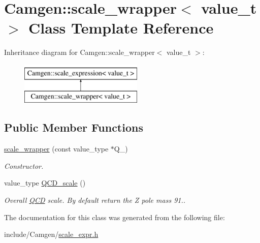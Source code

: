 \hypertarget{a00503}{}\section{Camgen\+:\+:scale\+\_\+wrapper$<$ value\+\_\+t $>$ Class Template Reference}
\label{a00503}
Inheritance diagram for Camgen\+:\+:scale\+\_\+wrapper$<$ value\+\_\+t $>$\+:\begin{figure}[H]
\begin{center}
\leavevmode
\includegraphics[height=2.000000cm]{a00503}
\end{center}
\end{figure}
\subsection*{Public Member Functions}
\begin{DoxyCompactItemize}
\item 
\hypertarget{a00503_ab05a7aef10a090493e0c21d13cc6b7e1}{}\hyperlink{a00503_ab05a7aef10a090493e0c21d13cc6b7e1}{scale\+\_\+wrapper} (const value\+\_\+type $\ast$Q\+\_\+)\label{a00503_ab05a7aef10a090493e0c21d13cc6b7e1}

\begin{DoxyCompactList}\small\item\em Constructor. \end{DoxyCompactList}\item 
\hypertarget{a00503_a81b1bf92d85b852ea6dfee8e584a7939}{}value\+\_\+type \hyperlink{a00503_a81b1bf92d85b852ea6dfee8e584a7939}{Q\+C\+D\+\_\+scale} ()\label{a00503_a81b1bf92d85b852ea6dfee8e584a7939}

\begin{DoxyCompactList}\small\item\em Overall \hyperlink{a00460}{Q\+C\+D} scale. By default return the Z pole mass 91.. \end{DoxyCompactList}\end{DoxyCompactItemize}


The documentation for this class was generated from the following file\+:\begin{DoxyCompactItemize}
\item 
include/\+Camgen/\hyperlink{a00766}{scale\+\_\+expr.\+h}\end{DoxyCompactItemize}
